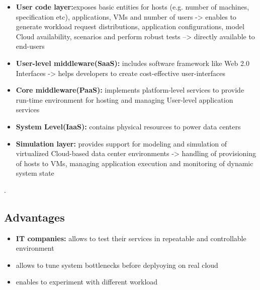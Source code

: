 \begin{itemize}
   \item \textbf{User code layer:}exposes basic entities for hosts (e.g. number of machines, specification etc), applications, VMs and number of users -> enables to generate workload request distributions, application configurations, model Cloud availability, scenarios and perform robust tests
   --> directly available to end-users
   \item \textbf{User-level middleware(SaaS): } includes software framework like Web 2.0 Interfaces
   -> helps developers to create cost-effective user-interfaces 
   \item \textbf{Core middleware(PaaS): } implements platform-level services to provide run-time environment for hosting and managing User-level application services
   \item \textbf{System Level(IaaS): } contains physical resources to power data centers
   \item \textbf{Simulation layer:} provides support for modeling and simulation of virtualized Cloud-based data center environments -> handling of provisioning of hosts to VMs, managing application execution and monitoring of dynamic system state  
    
\end{itemize}
.

 \subsection{Advantages}
\begin{itemize}
   \item \textbf{IT companies:} allows to test their services in repeatable and controllable environment
   \item \textbf{} allows to tune system bottlenecks before deplyoying on real cloud
   \item \textbf{} enables to experiment with different workload 
\end{itemize}



















